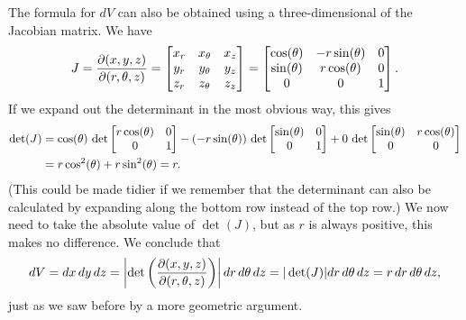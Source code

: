 \documentclass[reqno]{amsart}
\theoremstyle{definition}
\begin{document}
The formula for $dV$ can also be obtained using a three-dimensional of
the Jacobian matrix.  We have
\[ J = \frac{\partial(x,y,z)}{\partial(r,\theta,z)}
     = \left[\begin{matrix} x_r & x_\theta & x_z \\
            y_r & y_\theta & y_z \\
            z_r & z_\theta & z_z \end{matrix}\right] 
     = \left[\begin{matrix} \cos(\theta) & -r\sin(\theta) & 0 \\
            \sin(\theta) &  r\cos(\theta) & 0 \\
            0          &  0           & 1 \end{matrix}\right].
\]
If we expand out the determinant in the most obvious way, this gives 
\begin{align*}
 \det(J) &= \cos(\theta)\,\det\left[\begin{matrix} r\cos(\theta) & 0 \\ 0 & 1 \end{matrix}\right] 
            - (-r\sin(\theta)) \,\det\left[\begin{matrix} \sin(\theta) & 0 \\ 0 & 1 \end{matrix}\right]
            + 0 \,\det\left[\begin{matrix} \sin(\theta) & r\cos(\theta) \\ 0 & 0 \end{matrix}\right] \\
         &= r\cos^2(\theta) + r\sin^2(\theta) = r.
\end{align*}
(This could be made tidier if we remember that the determinant can
also be calculated by expanding along the bottom row instead of the
top row.)  We now need to take the absolute value of $\det(J)$, but as
$r$ is always positive, this makes no difference.  We conclude that
\[ dV = dx\,dy\,dz =
    \left|\det\left(\frac{\partial(x,y,z)}{\partial(r,\theta,z)}\right)\right|
     dr\,d\theta\,dz = |\det(J)| dr\,d\theta\,dz = r\,dr\,d\theta\,dz,
\]
just as we saw before by a more geometric argument.
\end{document}
